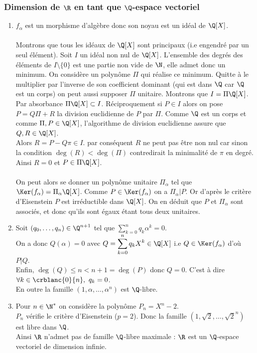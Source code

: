 \documentclass{book}
\begin{document}
	\subsubsection{Dimension de $\R$ en tant que $\Q$-espace vectoriel }
	\begin{enumerate}[leftmargin=*]
		\item $f_\alpha$ est un morphisme d'algèbre donc son noyau est un idéal de $\Q[X]$.\\\\
		Montrons que tous les idéaux de $\Q[X]$ sont principaux (i.e engendré par un seul élément). Soit $I$ un idéal non nul de $\Q[X]$. L'ensemble des degrés des éléments de $I\setminus\{0\}$ est une partie non vide de $\N$, elle admet donc un minimum. On considère un polynôme $\Pi$ qui réalise ce minimum. Quitte à le multiplier par l'inverse de son coefficient dominant (qui est dans $\Q$ car $\Q$ est un corps) on peut aussi supposer $\Pi$ unitaire. Montrons que $I=\Pi\Q[X]$.\\
		Par absorbance $\Pi\Q[X]\subset I$. Réciproquement si $P\in I$ alors on pose $P=Q\Pi+R$ la division euclidienne de $P$ par $\Pi$. Comme $\Q$ est un corps et comme $\Pi,P\in \Q[X]$, l'algorithme de division euclidienne assure que $Q,R\in \Q[X]$.\\
		Alors $R=P-Q\pi\in I$. par conséquent $R$ ne peut pas être non nul car sinon la condition $\deg(R)<\deg(\Pi)$ contredirait la minimalité de $\pi$ en degré. Ainsi $R=0$ et $P\in \Pi\Q[X]$.\\\\
		On peut alors se donner un polynôme unitaire $\Pi_\alpha$ tel que $\Ker(f_\alpha)=\Pi_\alpha\Q[X]$. Comme $P\in \Ker(f_\alpha)$ on a $\Pi_\alpha|P$. Or d'après le critère d'Eisenstein $P$ est irréductible dans $\Q[X]$. On en déduit que $P$ et $\Pi_\alpha$ sont associés, et donc qu'ils sont égaux étant tous deux unitaires.
		\item Soit $(q_0,\dots,q_n)\in \Q^{n+1}$ tel que $\displaystyle\sum_{k=0}^nq_k\alpha^k=0$.\\
		On a donc $Q(\alpha)=0$ avec $Q=\displaystyle\sum_{k=0}^nq_kX^k\in \Q[X]$ i.e $Q\in \Ker(f_\alpha)$ d'où $P|Q$.\\
		Enfin, $\deg(Q)\leq n<n+1=\deg(P)$ donc $Q=0$. C'est à dire $\forall k\in \crblanc{0}{n},\ q_k=0$.\\
		En outre la famille $(1,\alpha,\dots,\alpha^n)$ est $\Q$-libre.
		\item Pour $n\in \N^*$ on considère la polynôme $P_n=X^n-2$.\\
		$P_n$ vérifie le critère d'Eisenstein ($p=2$). Donc la famille $(1,\sqrt 2,\dots,{\sqrt 2}^n)$ est libre dans $\Q$.\\
		Ainsi $\R$ n'admet pas de famille $\Q$-libre maximale : $\R$ est un $\Q$-espace vectoriel de dimension infinie.
	\end{enumerate}
	
\end{document}

